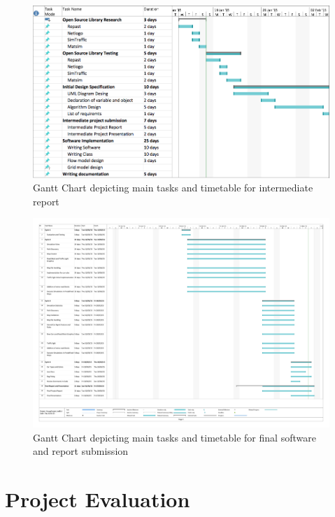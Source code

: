 \documentclass[oneside]{article}
\begin{document}
\begin{figure}[h] 
\centering \includegraphics[width=6in]{ganttchart_old} 
\caption{Gantt Chart depicting main tasks and timetable for intermediate report \label{fig:ganttChartOld}} 
\end{figure}
\newpage
 
\begin{figure}[h2] 
\centering \includegraphics[width=6in]{gantt_chart}
\caption{Gantt Chart depicting main tasks and timetable for final software and report submission \label{fig:ganttChartNew}} \end{figure}
\newpage


\section{Project Evaluation}
\end{document}
